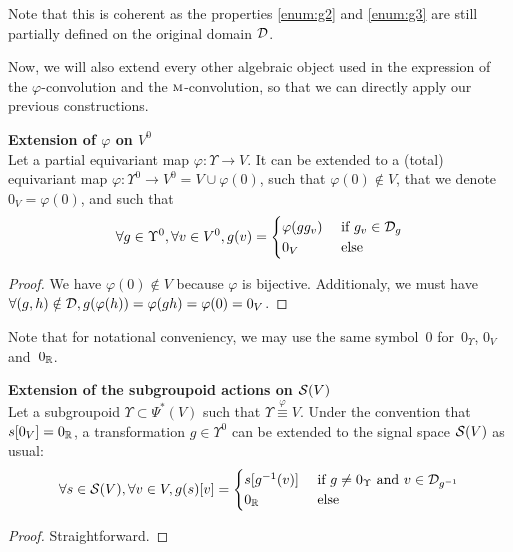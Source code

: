 \begin{remark}Note that this is coherent as the properties \ref{enum:g2} and \ref{enum:g3} are still partially defined on the original domain $\mathcal{D}$.
\end{remark}

Now, we will also extend every other algebraic object used in the expression of the $\varphi$-convolution and the $\operatorname{\textsc{m}}$-convolution, so that we can directly apply our previous constructions.

\begin{lemma}\textbf{Extension of $\varphi$ on $V^0$}\\
Let a partial equivariant map $\varphi: \Upsilon \rightarrow V$. It can be extended to a (total) equivariant map $\varphi: \Upsilon^0 \rightarrow V^0 = V \cup \varphi(0)$, such that $\varphi(0) \notin V$, that we denote $0_V = \varphi(0)$, and such that
\begin{gather*}
	\forall g \in \Upsilon^0, \forall v \in V^0, g(v) = \begin{cases} \varphi(gg_v) &\text{ if } g_v \in \mathcal{D}_g\\ 0_V &\text{ else}\end{cases}
\end{gather*}
\end{lemma}
\begin{proof}
We have $\varphi(0) \notin V$ because $\varphi$ is bijective. Additionaly, we must have $\forall (g,h) \notin \mathcal{D}, g(\varphi(h)) = \varphi(gh) = \varphi(0) = 0_V$.
\end{proof}

\begin{remark} Note that for notational conveniency, we may use the same symbol~$0$ for~$0_{\Upsilon}$, $0_V$ and~$0_{\mathbb{R}}$.
\end{remark}

\begin{lemma}\textbf{Extension of the subgroupoid actions on $\mathcal{S}(V)$}\\
Let a subgroupoid $\Upsilon \subset \Psi^*(V)$ such that $\Upsilon \overset\varphi\equiv V$. Under the convention that $s[0_V] = 0_{\mathbb{R}}$, a transformation $g \in \Upsilon^0$ can be extended to the signal space $\mathcal{S}(V)$ as usual:
\begin{gather*}
\forall s \in \cs(V), \forall v \in V, g(s)[v] =
  \begin{cases}
    s[g^{-1}(v)] &\text{ if } g \neq 0_\Upsilon \text{ and } v \in \cd_{g^{-1}}\\
    0_\bbr%
      &\text{ else}
  \end{cases}
\end{gather*}
\end{lemma}
\begin{proof}
Straightforward.
\end{proof}

